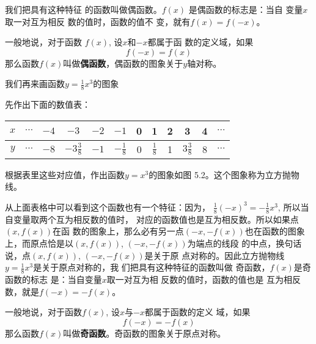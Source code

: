 我们把具有这种特征
的函数叫做偶函数。$f(x)$
是偶函数的标志是：当自
变量$x$取一对互为相反
数的值时，函数的值不
变，就有$f(x)=f(-x)$。

一般地说，对于函数
$f(x)$, 设$x$和$-x$都属于函
数的定义域，如果
\[f(-x)=f(x)\]
那么函数$f(x)$叫做\textbf{偶函数}，偶函数的图象关于$y$轴对称。

我们再来画函数$y=\frac{1}{8}x^3$的图象

先作出下面的数值表：
\begin{center}
\begin{tabular}{c|ccccccccccc}
    \hline
    $x$ &$\cdots$&$-4$&$-3$&$-2$&$-1$&0&1&2&3&4&$\cdots$\\
\hline
$y$ &$\cdots$&$-8$&$-3\frac{3}{8}$&$-1$&$-\frac{1}{8}$&0&$\frac{1}{8}$&1&$3\frac{3}{8}$&8&$\cdots$\\
\hline
\end{tabular}
\end{center}

根据表里这些对应值，作出函数$y=x^3$的图象如图
5.2。这个图象称为立方抛物线。
\begin{figure}[htp]
    \centering
{}
    \caption{}
\end{figure}

从上面表格中可以看到这个函数也有一个特征：因为，
$\frac{1}{8}(-x)^3=-\frac{1}{8}x^3$, 所以当自变量取两个互为相反数的值时，
对应的函数值也是互为相反数。所以如果点$(x,f(x))$在函
数的图象上，那么必有另一点$(-x,-f(x))$也在函数的图象
上，而原点恰是以$(x,f(x))$, $(-x,-f(x))$为端点的线段
的中点，换句话说，点$(x,f(x))$, $(-x,-f(x))$是关于原
点对称的。因此立方抛物线
$y=\frac{1}{8}x^3$是关于原点对称的，我
们把具有这种特征的函数叫做
奇函数，$f(x)$是奇函数的标志
是：当自变量$x$取一对互为相
反数的值时，函数的值也是
互为相反数，就是$f(-x)=-f(x)$。

一般地说，对于函数$f(x)$, 设$x$与$-x$都属于函数的定义
域，如果$$f(-x)=-f(x)$$ 那么函数$f(x)$叫做\textbf{奇函数}。奇函数的图象关于原点对称。

